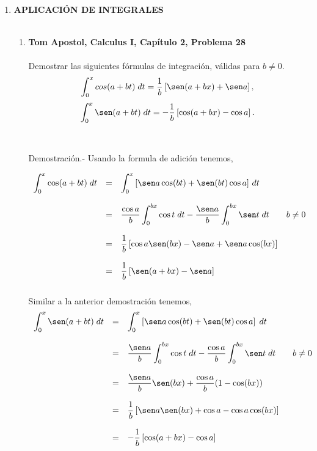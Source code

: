 \begin{enumerate}

\item \textbf{\large APLICACIÓN DE INTEGRALES}\\\\

    \begin{enumerate}[\bfseries a)]

	\item \textbf{\large Tom Apostol, Calculus I, Capítulo 2, Problema 28}\\\\
	Demostrar las siguientes fórmulas de integración, válidas para $b\neq 0$.
	$$\int_0^x cos(a+bt)\; dt = \dfrac{1}{b}\left[\sen(a+bx)+\sen a\right],$$
	$$\int_0^x \sen (a+bt)\; dt = -\dfrac{1}{b} \left[\cos(a+bx)-\cos a\right].$$\\\\

	Demostración.-\; Usando la formula de adición tenemos,

	$$\begin{array}{rcl}
	    \displaystyle\int_0^x \cos(a+bt)\; dt&=&\displaystyle\int_0^x \left[\sen a \cos(bt)+\sen(bt)\cos a\right]\, dt\\\\
						 &=&\dfrac{\cos a}{b} \displaystyle\int_0^{bx} \cos t \; dt  - \dfrac{\sen a}{b} \displaystyle\int_0^{bx} \sen t \; dt \qquad b\neq 0\\\\
						 &=&\dfrac{1}{b}\left[\cos a \sen(bx)-\sen a + \sen a \cos(bx)\right]\\\\
						 &=&\dfrac{1}{b}\left[\sen(a+bx)-\sen a\right]\\\\

	\end{array}$$
	Similar a la anterior demostración tenemos, \\

	 $$\begin{array}{rcl}
	     \displaystyle\int_0^x \sen(a+bt)\; dt&=&\displaystyle\int_0^x \left[\sen a \cos(bt)+\sen(bt)\cos a\right]\; dt\\\\
						  &=&\dfrac{\sen a}{b} \displaystyle\int_0^{bx} \cos t \; dt - \dfrac{\cos a}{b}\int_0^{bx} \sen t \; dt \qquad b\neq 0\\\\
						  &=&\dfrac{\sen a}{b}\sen(bx)+\dfrac{\cos a}{b}(1-\cos(bx))\\\\
						  &=&\dfrac{1}{b}\left[\sen a \sen (bx) + \cos a - \cos a \cos (bx)\right]\\\\
						  &=&-\dfrac{1}{b} \left[\cos(a+bx)-\cos a\right]\\\\
	 \end{array}$$


\end{enumerate}
\end{enumerate}
